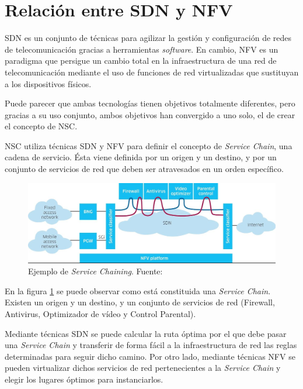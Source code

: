 \section{Relación entre SDN y NFV}
\label{sec:sdnnfv}

\ac{SDN} es un conjunto de técnicas para agilizar la gestión y configuración de redes de telecomunicación gracias a herramientas \textit{software}. En cambio, \ac{NFV} es un paradigma que persigue un cambio total en la infraestructura de una red de telecomunicación mediante el uso de funciones de red virtualizadas que sustituyan a los dispositivos físicos.

Puede parecer que ambas tecnologías tienen objetivos totalmente diferentes, pero gracias a su uso conjunto, ambos objetivos han convergido a uno solo, el de crear el concepto de \ac{NSC}.

\ac{NSC} utiliza técnicas \ac{SDN} y \ac{NFV} para definir el concepto de \textit{Service Chain}, una cadena de servicio. Ésta viene definida por un origen y un destino, y por un conjunto de servicios de red que deben ser atravesados en un orden específico.\cite{servicechainingbib}

\begin{figure}[!ht]
	\centering
	\includegraphics[width=0.8\linewidth]{imagenes/servicechaining}
	\caption{Ejemplo de \textit{Service Chaining}. Fuente:\cite{servicechainingbib}}
	\label{fig:servicechaining}
\end{figure}

En la figura \ref{fig:servicechaining} se puede observar como está constituida una \textit{Service Chain}. Existen un origen y un destino, y un conjunto de servicios de red (Firewall, Antivirus, Optimizador de vídeo y Control Parental).

Mediante técnicas \ac{SDN} se puede calcular la ruta óptima por el que debe pasar una \textit{Service Chain} y transferir de forma fácil a la infraestructura de red las reglas determinadas para seguir dicho camino. Por otro lado, mediante técnicas \ac{NFV} se pueden virtualizar dichos servicios de red pertenecientes a la \textit{Service Chain} y elegir los lugares óptimos para instanciarlos.


